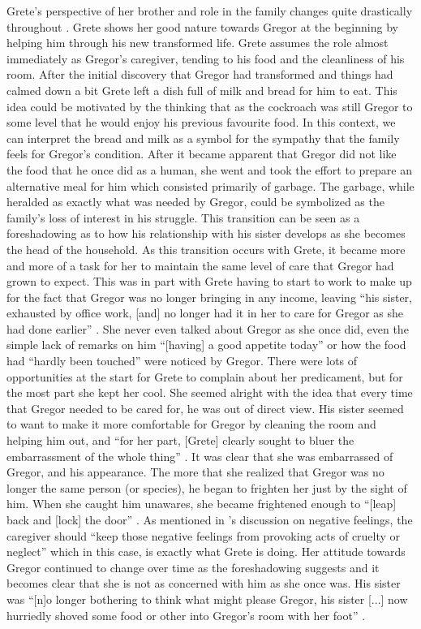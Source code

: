 \documentclass{article}
\begin{document}
Grete's perspective of her brother and role in the family changes quite
drastically throughout . Grete shows her good
nature towards Gregor at the beginning by helping him through his new
transformed life. Grete assumes the role almost immediately as Gregor's 
caregiver, tending to his food and the cleanliness of his room. After the
initial discovery that Gregor had transformed and things had calmed down a
bit Grete left a dish full of milk and bread for him to eat. This idea could
be motivated by the thinking that as the cockroach was still Gregor to some
level that he would enjoy his previous favourite food. In this context, we
can interpret the bread and milk as a symbol for the sympathy that the
family feels for Gregor's condition. After it became apparent that Gregor
did not like the food that he once did as a human, she went and took the
effort to prepare an alternative meal for him which consisted primarily of
garbage. The garbage, while heralded as exactly what was needed by Gregor,
could be symbolized as the family's loss of interest in his struggle. This
transition can be seen as a foreshadowing as to how his relationship with
his sister develops as she becomes the head of the household. As this
transition occurs with Grete, it became more and more of a task for her to
maintain the same level of care that Gregor had grown to expect. This was in
part with Grete having to start to work to make up for the fact that Gregor
was no longer bringing in any income, leaving ``his sister, exhausted by
office work, [and] no longer had it in her to care for Gregor as she had
done earlier'' \cite[131]{kafka2007meta}. She never even talked about Gregor
as she once did, even the simple lack of remarks on him ``[having] a good
appetite today'' or how the food had ``hardly been touched'' \cite[111,
111]{kafka2007meta} were noticed by Gregor. There were lots of opportunities
at the start for Grete to complain about her predicament, but for the most
part she kept her cool. She seemed alright with the idea that every time
that Gregor needed to be cared for, he was out of direct view. His sister
seemed to want to make it more comfortable for Gregor by cleaning the room
and helping him out, and ``for her part, [Grete] clearly sought to bluer the
embarrassment of the whole thing'' \cite[115]{kafka2007meta}. It was clear
that she was embarrassed of Gregor, and his appearance. The more that she
realized that Gregor was no longer the same person (or species), he began to
frighten her just by the sight of him. When she caught him unawares, she
became frightened enough to ``[leap] back and [lock] the door''
\cite[116]{kafka2007meta}. As mentioned in \citeauthor{rowe2002}'s
discussion on negative feelings, the caregiver should ``keep those negative
feelings from provoking acts of cruelty or neglect'' \cite[265]{rowe2002}
which in this case, is exactly what Grete is doing. Her attitude towards
Gregor continued to change over time as the foreshadowing suggests and it
becomes clear that she is not as concerned with him as she once was. His
sister was ``[n]o longer bothering to think what might please Gregor, his
sister [...] now hurriedly shoved some food or other into Gregor's room with
her foot'' \cite[130]{kafka2007meta}.
\end{document}
